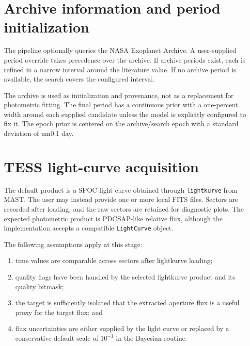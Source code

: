 \documentclass[12pt,a4paper,oneside]{report}
\newcommand{\code}[1]{\texttt{\small #1}}
\begin{document}
\section{Archive information and period initialization}
The pipeline optionally queries the NASA Exoplanet Archive. A user-supplied
period override takes precedence over the archive. If archive periods exist,
each is refined in a narrow interval around the literature value. If no archive
period is available, the search covers the configured interval.

The archive is used as initialization and provenance, not as a replacement for
photometric fitting. The final period has a continuous prior with a one-percent
width around each supplied candidate unless the model is explicitly configured
to fix it. The epoch prior is centered on the archive/search epoch with a
standard deviation of 
um{0.1} day.

\section{TESS light-curve acquisition}
The default product is a SPOC light curve obtained through \code{lightkurve}
from MAST. The user may instead provide one or more local FITS files. Sectors
are recorded after loading, and the raw sectors are retained for diagnostic
plots. The expected photometric product is PDCSAP-like relative flux, although
the implementation accepts a compatible \code{LightCurve} object.

The following assumptions apply at this stage:
\begin{enumerate}
  \item time values are comparable across sectors after lightkurve loading;
  \item quality flags have been handled by the selected lightkurve product and
        its quality bitmask;
  \item the target is sufficiently isolated that the extracted aperture flux is
        a useful proxy for the target flux; and
  \item flux uncertainties are either supplied by the light curve or replaced
        by a conservative default scale of \(10^{-3}\) in the Bayesian routine.
\end{enumerate}
\end{document}
